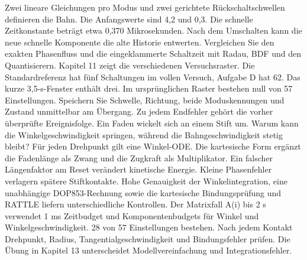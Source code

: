 Zwei lineare Gleichungen pro Modus und zwei gerichtete Rückschaltschwellen definieren die Bahn. Die Anfangswerte sind 4,2 und 0,3.
Die schnelle Zeitkonstante beträgt etwa 0,370 Mikrosekunden. Nach dem Umschalten kann die neue schnelle Komponente die alte Historie entwerten.
Vergleichen Sie den exakten Phasenfluss und die eingeklammerte Schaltzeit mit Radau, BDF und den Quantisierern. Kapitel 11 zeigt die verschiedenen Versuchsraster.
Die Standardreferenz hat fünf Schaltungen im vollen Versuch, Aufgabe D hat 62. Das kurze 3,5-s-Fenster enthält drei. Im ursprünglichen Raster bestehen null von 57 Einstellungen.
Speichern Sie Schwelle, Richtung, beide Moduskennungen und Zustand unmittelbar am Übergang. Zu jedem Endfehler gehört die vorher überprüfte Ereignisfolge.
Ein Faden wickelt sich an einem Stift um. Warum kann die Winkelgeschwindigkeit springen, während die Bahngeschwindigkeit stetig bleibt?
Für jeden Drehpunkt gilt eine Winkel-ODE. Die kartesische Form ergänzt die Fadenlänge als Zwang und die Zugkraft als Multiplikator.
Ein falscher Längenfaktor am Reset verändert kinetische Energie. Kleine Phasenfehler verlagern spätere Stiftkontakte.
Hohe Genauigkeit der Winkelintegration, eine unabhängige DOP853-Rechnung sowie die kartesische Bindungsprüfung und RATTLE liefern unterschiedliche Kontrollen.
Der Matrixfall A(i) bis 2 s verwendet 1 ms Zeitbudget und Komponentenbudgets für Winkel und Winkelgeschwindigkeit. 28 von 57 Einstellungen bestehen.
Nach jedem Kontakt Drehpunkt, Radius, Tangentialgeschwindigkeit und Bindungsfehler prüfen. Die Übung in Kapitel 13 unterscheidet Modellvereinfachung und Integrationsfehler.
